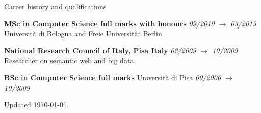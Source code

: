 \documentclass{resume}
\begin{document}
\begin{rSection}{Career history and qualifications}

		{\bf MSc in Computer Science full marks with honours} \hfill {\em  09/2010 $\rightarrow$ 03/2013} \\
		Universit\`a di Bologna and Freie Universit\"at Berlin 

		{\bf National Research Council of Italy, Pisa Italy} \hfill {\em 02/2009 $\rightarrow$ 10/2009}\\
			Researcher on semantic web and big data.

		{\bf BSc in Computer Science full marks} Universit\`a di Pisa \hfill {\em 09/2006 $\rightarrow$ 10/2009} \\
	\end{rSection}
	\begin{rSection}{}
		Updated \today.
	\end{rSection}
\end{document}

